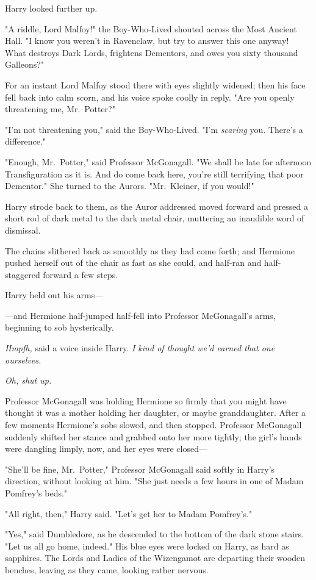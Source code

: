 Harry looked further up.

"A riddle, Lord Malfoy!" the Boy-Who-Lived shouted across the Most Ancient
Hall. "I know you weren't in Ravenclaw, but try to answer this one anyway! What
destroys Dark Lords, frightens Dementors, and owes you sixty thousand Galleons?"

For an instant Lord Malfoy stood there with eyes slightly widened; then his
face fell back into calm scorn, and his voice spoke coolly in reply. "Are you
openly threatening me, Mr.~Potter?"

"I'm not threatening you," said the Boy-Who-Lived. "I'm \emph{scaring} you.
There's a difference."

"Enough, Mr.~Potter," said Professor McGonagall. "We shall be late for
afternoon Transfiguration as it is. And do come back here, you're still
terrifying that poor Dementor." She turned to the Aurors. "Mr.~Kleiner, if you
would!"

Harry strode back to them, as the Auror addressed moved forward and pressed a
short rod of dark metal to the dark metal chair, muttering an inaudible word of
dismissal.

The chains slithered back as smoothly as they had come forth; and Hermione
pushed herself out of the chair as fast as she could, and half-ran and
half-staggered forward a few steps.

Harry held out his arms---

---and Hermione half-jumped half-fell into Professor McGonagall's arms,
beginning to sob hysterically.

\emph{Hmpfh,} said a voice inside Harry. \emph{I kind of thought we'd earned
that one ourselves.}

\emph{Oh, shut up.}

Professor McGonagall was holding Hermione so firmly that you might have thought
it was a mother holding her daughter, or maybe granddaughter. After a few
moments Hermione's sobs slowed, and then stopped. Professor McGonagall suddenly
shifted her stance and grabbed onto her more tightly; the girl's hands were
dangling limply, now, and her eyes were closed---

"She'll be fine, Mr.~Potter," Professor McGonagall said softly in Harry's
direction, without looking at him. "She just needs a few hours in one of Madam
Pomfrey's beds."

"All right, then," Harry said. "Let's get her to Madam Pomfrey's."

"Yes," said Dumbledore, as he descended to the bottom of the dark stone stairs.
"Let us all go home, indeed." His blue eyes were locked on Harry, as hard as
sapphires.
\later
The Lords and Ladies of the Wizengamot are departing their wooden benches,
leaving as they came, looking rather nervous.

